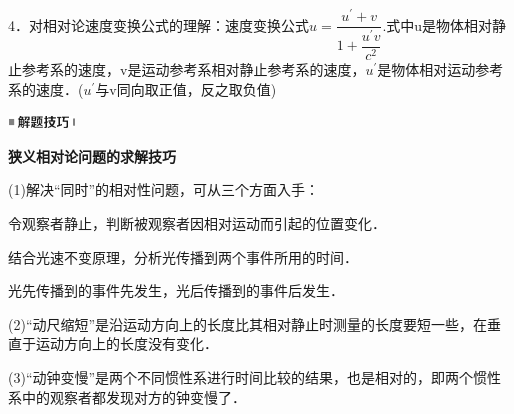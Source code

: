 4．对相对论速度变换公式的理解：速度变换公式$u=\dfrac{u^\prime+v}{1+\dfrac{u^\prime v}{c^2}}$.式中u是物体相对静止参考系的速度，v是运动参考系相对静止参考系的速度，$u^\prime$是物体相对运动参考系的速度．($u^\prime$与v同向取正值，反之取负值)


\begin{center}\includegraphics[width=0.70764in,height=0.12292in]{media/image37.png}\end{center}
\begin{center}
  \textbf{狭义相对论问题的求解技巧}
\end{center}

(1)解决``同时''的相对性问题，可从三个方面入手：

令观察者静止，判断被观察者因相对运动而引起的位置变化．

结合光速不变原理，分析光传播到两个事件所用的时间．

光先传播到的事件先发生，光后传播到的事件后发生．

(2)``动尺缩短''是沿运动方向上的长度比其相对静止时测量的长度要短一些，在垂直于运动方向上的长度没有变化．

(3)``动钟变慢''是两个不同惯性系进行时间比较的结果，也是相对的，即两个惯性系中的观察者都发现对方的钟变慢了．
